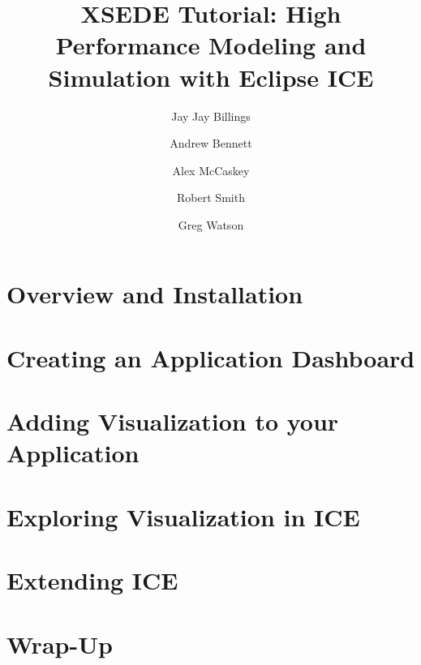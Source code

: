 \documentclass{report}
\begin{document}
\title{XSEDE Tutorial: High Performance Modeling and Simulation with Eclipse ICE}
\author{Jay Jay Billings}
\author{Andrew Bennett}
\author{Alex McCaskey}
\author{Robert Smith}
\author{Greg Watson}

\maketitle{} 

\tableofcontents

\chapter{Overview and Installation}


\graphicspath{{../../installation/src/}}


\chapter{Creating an Application Dashboard}
\graphicspath{{../../newItemGeneration/src/}}


\chapter{Adding Visualization to your Application}
\graphicspath{{../../resourceComponents/src/}}


\chapter{Exploring Visualization in ICE}
\graphicspath{{../../geometryEditor/src/}}


\graphicspath{{../../meshEditor/src/}}


\graphicspath{{../../visualization/src/}}


\chapter{Extending ICE}
\graphicspath{{../../scripting/src/}}
\lstset{inputpath=../../scripting/src/}


\chapter{Wrap-Up}
\end{document}
